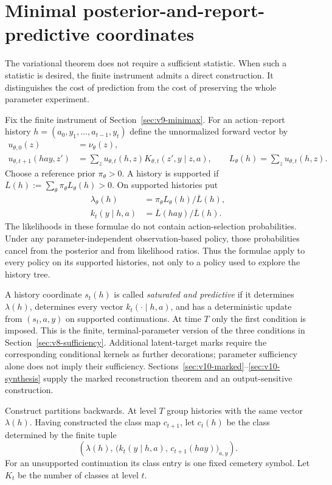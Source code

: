 \section{Minimal posterior-and-report-predictive coordinates}
\label{sec:v9-saturation}
The variational theorem does not require a sufficient statistic. When
such a statistic is desired, the finite instrument admits a direct
construction. It distinguishes the cost of prediction from the cost of
preserving the whole parameter experiment.

Fix the finite instrument of Section~\ref{sec:v9-minimax}. For an
action--report history $h=(a_0,y_1,\ldots,a_{t-1},y_t)$ define the
unnormalized forward vector by
\begin{align}
 u_{\theta,0}(z)&=\nu_\theta(z),\nonumber\\
 u_{\theta,t+1}(hay,z')
   &=\sum_z u_{\theta,t}(h,z)K_{\theta,t}(z',y\mid z,a),
   \qquad L_\theta(h)=\sum_z u_{\theta,t}(h,z).
 \label{eq:v9-forward}
\end{align}
Choose a reference prior $\pi_\theta>0$. A history is supported if
$\overline L(h):=\sum_\theta\pi_\theta L_\theta(h)>0$. On supported
histories put
\begin{align}
 \lambda_\theta(h)&=\pi_\theta L_\theta(h)/\overline L(h),\nonumber\\
 k_t(y\mid h,a)&=\overline L(hay)/\overline L(h).
 \label{eq:v9-finitepredict}
\end{align}
The likelihoods in these formulae do not contain action-selection
probabilities. Under any parameter-independent observation-based policy,
those probabilities cancel from the posterior and from likelihood ratios.
Thus the formulae apply to every policy on its supported histories, not
only to a policy used to explore the history tree.

A history coordinate $s_t(h)$ is called \emph{saturated and predictive}
if it determines $\lambda(h)$, determines every vector
$k_t(\cdot\mid h,a)$, and has a deterministic update from $(s_t,a,y)$ on
supported continuations. At time $T$ only the first condition is imposed.
This is the finite, terminal-parameter version of the three conditions
in Section~\ref{sec:v8-sufficiency}. Additional latent-target marks
require the corresponding conditional kernels as further decorations;
parameter sufficiency alone does not imply their sufficiency.
Sections~\ref{sec:v10-marked}--\ref{sec:v10-synthesis} supply the
marked reconstruction theorem and an output-sensitive construction.

Construct partitions backwards. At level $T$ group histories with the
same vector $\lambda(h)$. Having constructed the class map $c_{t+1}$,
let $c_t(h)$ be the class determined by the finite tuple
\begin{equation}
 \left(\lambda(h),\,
   \big(k_t(y\mid h,a),\,c_{t+1}(hay)\big)_{a,y}\right).
 \label{eq:v9-saturatedkey}
\end{equation}
For an unsupported continuation its class entry is one fixed cemetery
symbol. Let $K_t$ be the number of classes at level $t$.

